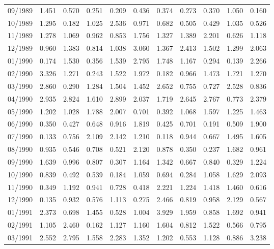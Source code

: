 \begin{tabular}{lrrrrrrrrrr}
09/1989 &  1.451 &  0.570 &  0.251 &  0.209 &  0.436 &  0.374 &  0.273 &  0.370 &  1.050 &  0.160 \\
10/1989 &  1.295 &  0.182 &  1.025 &  2.536 &  0.971 &  0.682 &  0.505 &  0.429 &  1.035 &  0.526 \\
11/1989 &  1.278 &  1.069 &  0.962 &  0.853 &  1.756 &  1.327 &  1.389 &  2.201 &  0.626 &  1.118 \\
12/1989 &  0.960 &  1.383 &  0.814 &  1.038 &  3.060 &  1.367 &  2.413 &  1.502 &  1.299 &  2.063 \\
01/1990 &  0.174 &  1.530 &  0.356 &  1.539 &  2.795 &  1.748 &  1.167 &  0.294 &  0.139 &  2.266 \\
02/1990 &  3.326 &  1.271 &  0.243 &  1.522 &  1.972 &  0.182 &  0.966 &  1.473 &  1.721 &  1.270 \\
03/1990 &  2.860 &  0.290 &  1.284 &  1.504 &  1.452 &  2.652 &  0.755 &  0.727 &  2.528 &  0.836 \\
04/1990 &  2.935 &  2.824 &  1.610 &  2.899 &  2.037 &  1.719 &  2.645 &  2.767 &  0.773 &  2.379 \\
05/1990 &  1.202 &  1.028 &  1.788 &  2.007 &  0.701 &  0.392 &  1.068 &  1.597 &  1.225 &  1.463 \\
06/1990 &  0.350 &  0.427 &  0.648 &  0.916 &  1.819 &  0.425 &  0.701 &  0.191 &  0.509 &  1.900 \\
07/1990 &  0.133 &  0.756 &  2.109 &  2.142 &  1.210 &  0.118 &  0.944 &  0.667 &  1.495 &  1.605 \\
08/1990 &  0.935 &  0.546 &  0.708 &  0.521 &  2.120 &  0.878 &  0.350 &  0.237 &  1.682 &  0.961 \\
09/1990 &  1.639 &  0.996 &  0.807 &  0.307 &  1.164 &  1.342 &  0.667 &  0.840 &  0.329 &  1.224 \\
10/1990 &  0.839 &  0.492 &  0.539 &  0.184 &  1.059 &  0.694 &  0.284 &  1.058 &  1.629 &  2.093 \\
11/1990 &  0.349 &  1.192 &  0.941 &  0.728 &  0.418 &  2.221 &  1.224 &  1.418 &  1.460 &  0.616 \\
12/1990 &  0.135 &  0.932 &  0.576 &  1.113 &  0.275 &  2.466 &  0.819 &  0.958 &  2.129 &  0.567 \\
01/1991 &  2.373 &  0.698 &  1.455 &  0.528 &  1.004 &  3.929 &  1.959 &  0.858 &  1.692 &  0.941 \\
02/1991 &  1.105 &  2.460 &  0.162 &  1.127 &  1.160 &  1.604 &  0.812 &  1.522 &  0.566 &  0.795 \\
03/1991 &  2.552 &  2.795 &  1.558 &  2.283 &  1.352 &  1.202 &  0.553 &  1.128 &  0.886 &  3.238 \\

\end{tabular}

